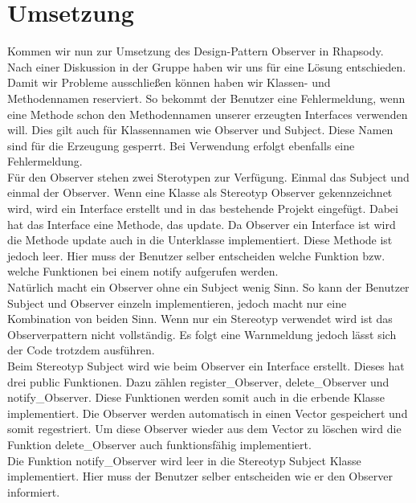 \section{Umsetzung}
Kommen wir nun zur Umsetzung des Design-Pattern Observer in Rhapsody. Nach
einer Diskussion in der Gruppe haben wir uns für eine Lösung entschieden. Damit
wir Probleme ausschließen können haben wir Klassen- und Methodennamen
reserviert. So bekommt der Benutzer eine Fehlermeldung, wenn eine Methode schon
den Methodennamen unserer erzeugten Interfaces verwenden will. Dies gilt auch für
Klassennamen wie Observer und Subject. Diese Namen sind für die Erzeugung
gesperrt. Bei Verwendung erfolgt ebenfalls eine Fehlermeldung.\\
Für den Observer stehen zwei Sterotypen zur Verfügung. Einmal das Subject und
einmal der Observer. Wenn eine Klasse als Stereotyp Observer gekennzeichnet wird, wird ein
Interface erstellt und in das bestehende Projekt eingefügt. Dabei hat das
Interface eine Methode, das update. Da Observer ein Interface ist wird die
Methode update auch in die Unterklasse implementiert. Diese Methode ist jedoch
leer. Hier muss der Benutzer selber entscheiden welche Funktion bzw. welche
Funktionen bei einem notify aufgerufen werden.\\
Natürlich macht ein Observer ohne ein Subject wenig Sinn. So kann der Benutzer
Subject und Observer einzeln implementieren, jedoch macht nur eine Kombination
von beiden Sinn. Wenn nur ein Stereotyp verwendet wird ist das Observerpattern
nicht vollständig. Es folgt eine Warnmeldung jedoch lässt sich der Code trotzdem
ausführen.\\
Beim Stereotyp Subject wird wie beim Observer ein Interface erstellt. Dieses hat
drei public Funktionen. Dazu zählen register_Observer, delete_Observer und
notify_Observer. Diese Funktionen werden somit auch in die erbende Klasse
implementiert. Die Observer werden automatisch in einen Vector gespeichert und
somit regestriert. Um diese Observer wieder aus dem Vector zu löschen wird die
Funktion delete_Observer auch funktionsfähig implementiert. \\
Die Funktion notify_Observer wird leer in die Stereotyp Subject Klasse
implementiert. Hier muss der Benutzer selber entscheiden wie er den Observer
informiert. 


						